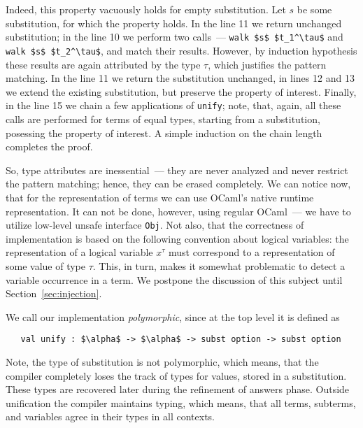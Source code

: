 Indeed, this property vacuously holds for empty substitution. Let $s$ be some substitution, for which the
property holds. In the line 11 we return unchanged substitution; in the line 10 we perform two calls~--- 
\lstinline{walk $s$ $t_1^\tau$} and \lstinline{walk $s$ $t_2^\tau$}, and match their results. However, 
by induction hypothesis these results are again attributed by the type $\tau$, which justifies the
pattern matching. In the line 11 we return the substitution unchanged, in lines 12 and 13 we extend the
existing substitution, but preserve the property of interest. Finally, in the line 15 we chain a few
applications of \lstinline{unify}; note, that, again, all these calls are performed for terms of equal 
types, starting from a substitution, posessing the property of interest. A simple induction on the
chain length completes the proof.

So, type attributes are inessential~--- they are never analyzed and never restrict the pattern matching; hence, 
they can be erased completely. We can notice now, that for the representation of terms we can use OCaml's
native runtime representation. It can not be done, however, using regular OCaml~--- we have to utilize
low-level unsafe interface \lstinline{Obj}. Not also, that the correctness of implementation is based on
the following convention about logical variables: the representation of a logical variable $x^\tau$ must
correspond to a representation of some value of type $\tau$. This, in turn, makes it somewhat problematic
to detect a variable occurrence in a term. We postpone the discussion of this subject until Section~\ref{sec:injection}.

We call our implementation \emph{polymorphic}, since at the top level it is defined as

\begin{lstlisting}
   val unify : $\alpha$ -> $\alpha$ -> subst option -> subst option
\end{lstlisting} 

Note, the type of substitution is not polymorphic, which means, that the compiler completely loses the track 
of types for values, stored in a substitution. These types are recovered later during the refinement of answers phase.
Outside unification the compiler maintains typing, which means, that all terms, subterms, and variables agree in their types 
in all contexts. 



